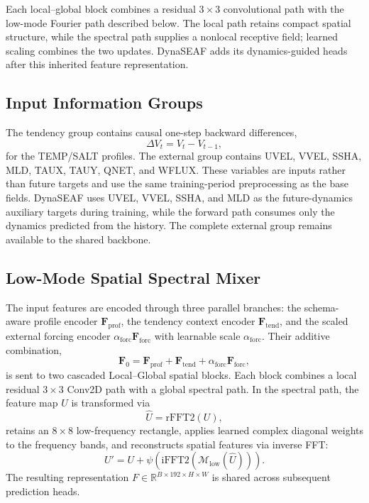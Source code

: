 \documentclass[conference]{IEEEtran}
\begin{document}
Each local--global block combines a residual $3\times3$ convolutional path with the low-mode Fourier path described below. The local path retains compact spatial structure, while the spectral path supplies a nonlocal receptive field; learned scaling combines the two updates. DynaSEAF adds its dynamics-guided heads after this inherited feature representation.

\subsection{Input Information Groups}
The tendency group contains causal one-step backward differences,
\begin{equation}
\Delta V_t=V_t-V_{t-1},
\label{eq:tendency}
\end{equation}
for the TEMP/SALT profiles. The external group contains UVEL, VVEL, SSHA, MLD, TAUX, TAUY, QNET, and WFLUX. These variables are inputs rather than future targets and use the same training-period preprocessing as the base fields. DynaSEAF uses UVEL, VVEL, SSHA, and MLD as the future-dynamics auxiliary targets during training, while the forward path consumes only the dynamics predicted from the history. The complete external group remains available to the shared backbone.

\subsection{Low-Mode Spatial Spectral Mixer}
The input features are encoded through three parallel branches: the schema-aware profile encoder $\mathbf{F}_{\mathrm{prof}}$, the tendency context encoder $\mathbf{F}_{\mathrm{tend}}$, and the scaled external forcing encoder $\alpha_{\mathrm{forc}}\mathbf{F}_{\mathrm{forc}}$ with learnable scale $\alpha_{\mathrm{forc}}$. Their additive combination,
\begin{equation}
\mathbf{F}_0 = \mathbf{F}_{\mathrm{prof}} + \mathbf{F}_{\mathrm{tend}} + \alpha_{\mathrm{forc}}\mathbf{F}_{\mathrm{forc}},
\end{equation}
is sent to two cascaded Local--Global spatial blocks. Each block combines a local residual $3\times3$ Conv2D path with a global spectral path. In the spectral path, the feature map $U$ is transformed via
\begin{equation}
\widehat{U}=\mathrm{rFFT2}(U),
\end{equation}
retains an $8\times8$ low-frequency rectangle, applies learned complex diagonal weights to the frequency bands, and reconstructs spatial features via inverse FFT:
\begin{equation}
U'=U+\psi\left(\mathrm{iFFT2}\left(\mathcal{M}_{\mathrm{low}}(\widehat{U})\right)\right).
\label{eq:spectral}
\end{equation}
The resulting representation $F\in\mathbb{R}^{B\times192\times H\times W}$ is shared across subsequent prediction heads.
\end{document}
